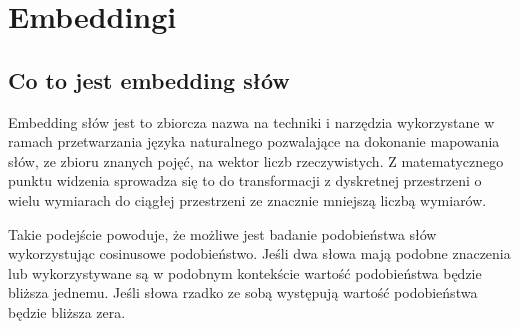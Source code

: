 \newpage %
\section{Embeddingi}

\subsection{Co to jest embedding słów}





Embedding słów jest to zbiorcza nazwa na techniki i narzędzia wykorzystane w ramach przetwarzania języka naturalnego pozwalające na dokonanie mapowania słów, ze zbioru znanych pojęć, na wektor liczb rzeczywistych. Z matematycznego punktu widzenia sprowadza się to do transformacji z dyskretnej przestrzeni o wielu wymiarach do ciągłej przestrzeni ze znacznie mniejszą liczbą wymiarów. 



Takie podejście powoduje, że możliwe jest badanie podobieństwa słów wykorzystując cosinusowe podobieństwo. Jeśli dwa słowa mają podobne znaczenia lub wykorzystywane są w podobnym kontekście  wartość podobieństwa będzie bliższa jednemu. Jeśli słowa rzadko ze sobą występują wartość podobieństwa będzie bliższa zera. 








